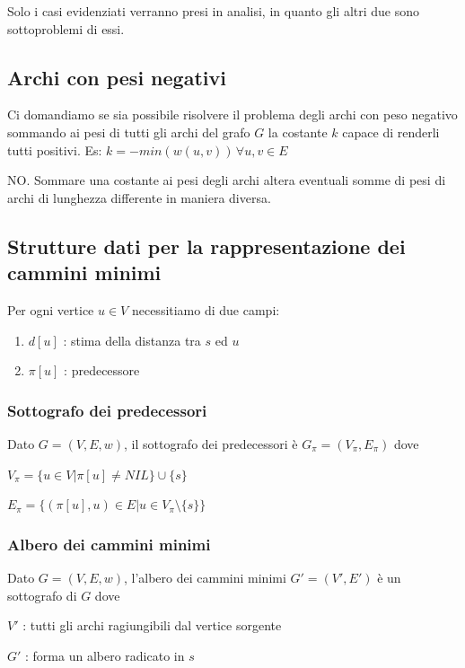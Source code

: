 \documentclass[11pt,a4paper,twoside,openright]{book}
\providecommand{\tightlist}{\setlength{\itemsep}{0pt}\setlength{\parskip}{0pt}}
\begin{document}
{{{Solo i casi evidenziati verranno presi in analisi, in quanto gli altri due sono sottoproblemi di essi.}

\subsection{Archi con pesi negativi}

{Ci domandiamo se sia possibile risolvere il problema degli archi con peso negativo sommando ai pesi di tutti gli archi del grafo $G$ la costante $k$ capace di renderli tutti positivi. Es: $k=-min(w(u,v))\,\forall u,v \in E$}

{NO. Sommare una costante ai pesi degli archi altera eventuali somme di pesi di archi di lunghezza differente in maniera diversa.}

\subsection{Strutture dati per la rappresentazione dei cammini minimi}

{Per ogni vertice $u \in V$ necessitiamo di due campi:}

\begin{enumerate}
\tightlist
\item
$d[u]$ : stima della distanza tra $s$ ed $u$
\item
$\pi[u]$ : predecessore
\end{enumerate}

\subsubsection{Sottografo dei predecessori}

{Dato $G=(V,E,w)$, il sottografo dei predecessori è $G_\pi=(V_\pi,E_\pi)$ dove}

$V_\pi=\{u \in V | \pi[u] \neq NIL\} \cup \{s\}$

$E_\pi=\{(\pi[u],u) \in E | u \in V_{\pi} \setminus \{s\}\}$

\subsubsection{Albero dei cammini minimi}

{Dato $G=(V,E,w)$, l'albero dei cammini minimi $G'=(V',E')$ è un sottografo di $G$ dove}

{$V'$ : tutti gli archi ragiungibili dal vertice sorgente}

{$G'$ : forma un albero radicato in $s$}

}}
\end{document}
